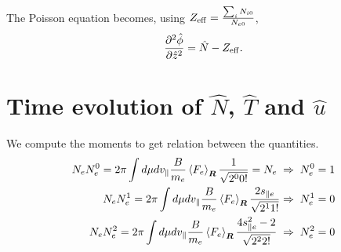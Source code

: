 \documentclass[final]{jpp}
\begin{document}
\begin{align}
\end{align}

The Poisson equation becomes, using $ Z_{\rm eff}=\frac{\sum_i N_{i0}}{N_{e0}} $,
\begin{align}
    \label{eq:poisson}
    \frac{\partial^2\hat{\phi}}{\partial \hat{z}^2}=\hat{N}-Z_{\rm eff}.
\end{align}




\section{Time evolution of $\hat{N}$, $\hat{T}$ and $ \hat u $} \label{sec:timeEvol}

We compute the moments to get relation between the quantities.
\begin{align}
N_e N_e^0=2\pi \int d \mu d \vparallel \frac{B}{m_e}  \gyaver{\gyFe}\frac{1}{\sqrt{2^00!}} = N_e \;\Rightarrow \; N_e^0=1\\
N_eN_e^1=2\pi \int d \mu d \vparallel \frac{B}{m_e}  \gyaver{\gyFe}\frac{2 s_{\parallel e}}{\sqrt{2^11!}} %
\Rightarrow \; N_e^1=0\\%
N_eN_e^2=2\pi \int d \mu d \vparallel \frac{B}{m_e}  \gyaver{\gyFe}\frac{4 s_{\parallel e}^2-2}{\sqrt{2^22!}} \;\Rightarrow \; N_e^2=0  %
\end{align}
\end{document}
